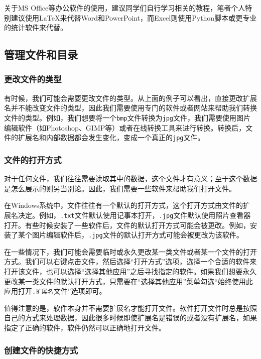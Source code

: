 关于MS Office等办公软件的使用，建议同学们自行学习相关的教程，笔者个人特别建议使用LaTeX来代替Word和PowerPoint，而Excel则使用Python脚本或更专业的统计软件来代替。

\subsection{管理文件和目录}

\subsubsection{更改文件的类型}

有时候，我们可能会需要更改文件的类型。从上面的例子可以看出，直接更改扩展名并不能改变文件的类型，因此我们需要使用专门的软件或者网站来帮助我们转换文件的类型。例如，我们想要将一个\texttt{bmp}文件转换为\texttt{jpg}文件，我们需要使用图片编辑软件（如Photoshop、GIMP等）或者在线转换工具来进行转换。转换后，文件的扩展名和内部数据都会发生变化，变成一个真正的\texttt{jpg}文件。

\subsubsection{文件的打开方式}

对于任何文件，我们往往需要读取其中的数据，这个文件才有意义；至于这个数据是怎么展示的则另当别论。因此，我们需要一些软件来帮助我们打开文件。

在Windows系统中，文件往往有一个默认的打开方式，这个打开方式由文件的扩展名决定。例如，\texttt{.txt}文件默认使用记事本打开，\texttt{.jpg}文件默认使用照片查看器打开。有些时候安装了一些软件后，文件的默认打开方式可能会被更改。例如，安装了某个图片编辑软件后，\texttt{.jpg}文件的默认打开方式可能会被更改为该软件。

在一些情况下，我们可能会需要临时或永久更改某一类文件或者某一个文件的打开方式。我们可以右键点击文件，然后选择“打开方式”选项，选择一个合适的软件来打开该文件，也可以选择“选择其他应用”之后寻找指定的软件。如果我们想要永久更改某一类文件的默认打开方式，只需要在“选择其他应用”菜单勾选“始终使用此应用打开\texttt{.扩展名}文件”选项即可。

值得注意的是，软件本身并不需要扩展名才能打开文件。软件打开文件时总是按照自己的方式来处理数据，因此很多时候即使扩展名是错误的或者没有扩展名，如果指定了正确的软件，软件仍然可以正确地打开文件。

\subsubsection{创建文件的快捷方式}

